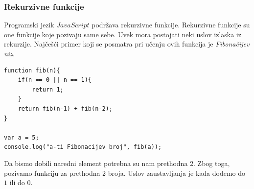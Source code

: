 \documentclass[a4paper]{article}
\begin{document}
\subsubsection{Rekurzivne funkcije}
Programski jezik $JavaScript$ podržava rekurzivne funkcije. Rekurzivne funkcije su one funkcije koje pozivaju same sebe. Uvek mora postojati neki uslov izlaska iz rekurzije. Najčešći primer koji se posmatra pri učenju ovih funkcija je \textit{Fibonačijev niz}.
\begin{lstlisting}[backgroundcolor = \color{lightgray}]
function fib(n){
	if(n == 0 || n == 1){
		return 1;	
	}
	return fib(n-1) + fib(n-2);
}

var a = 5;
console.log("a-ti Fibonacijev broj", fib(a));
\end{lstlisting}
Da bismo dobili naredni element potrebna su nam prethodna 2. Zbog toga, pozivamo funkciju za prethodna 2 broja. Uslov zaustavljanja je kada dođemo do $1$ ili do $0$.

\newpage
\end{document}
